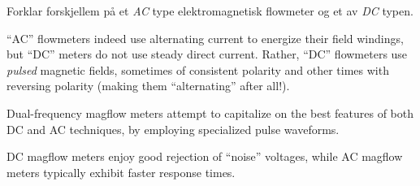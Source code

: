 


Forklar forskjellem på et {\it AC} type elektromagnetisk flowmeter og et av {\it DC} typen.  







``AC'' flowmeters indeed use alternating current to energize their field windings, but ``DC'' meters do not use steady direct current.  Rather, ``DC'' flowmeters use {\it pulsed} magnetic fields, sometimes of consistent polarity and other times with reversing polarity (making them ``alternating'' after all!).

Dual-frequency magflow meters attempt to capitalize on the best features of both DC and AC techniques, by employing specialized pulse waveforms.

\vskip 10pt

DC magflow meters enjoy good rejection of ``noise'' voltages, while AC magflow meters typically exhibit faster response times.










